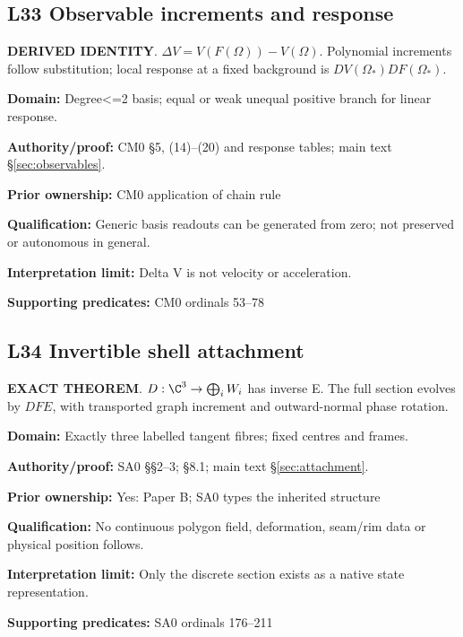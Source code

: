 \par\noindent\begin{minipage}{\linewidth}
\subsection*{L33 Observable increments and response}
\textbf{DERIVED IDENTITY}. \(\Delta V=V(F(\Omega))-V(\Omega)\). Polynomial increments follow substitution; local response at a fixed background is \(DV(\Omega_*)DF(\Omega_*)\).\par
\textbf{Domain:} Degree<=2 basis; equal or weak unequal positive branch for linear response.\par
\textbf{Authority/proof:} CM0 \S{}5, (14)--(20) and response tables; main text \S\ref{sec:observables}.\par
\textbf{Prior ownership:} CM0 application of chain rule\par
\textbf{Qualification:} Generic basis readouts can be generated from zero; not preserved or autonomous in general.\par
\textbf{Interpretation limit:} Delta V is not velocity or acceleration.\par
\textbf{Supporting predicates:} CM0 ordinals 53--78\par
\end{minipage}\par\medskip
\par\noindent\begin{minipage}{\linewidth}
\subsection*{L34 Invertible shell attachment}
\textbf{EXACT THEOREM}. \(D:\C^3\to\bigoplus_i W_i\) has inverse E. The full section evolves by \(DFE\), with transported graph increment and outward-normal phase rotation.\par
\textbf{Domain:} Exactly three labelled tangent fibres; fixed centres and frames.\par
\textbf{Authority/proof:} SA0 \S{}\S{}2--3; \S{}8.1; main text \S\ref{sec:attachment}.\par
\textbf{Prior ownership:} Yes: Paper B; SA0 types the inherited structure\par
\textbf{Qualification:} No continuous polygon field, deformation, seam/rim data or physical position follows.\par
\textbf{Interpretation limit:} Only the discrete section exists as a native state representation.\par
\textbf{Supporting predicates:} SA0 ordinals 176--211\par
\end{minipage}\par\medskip
